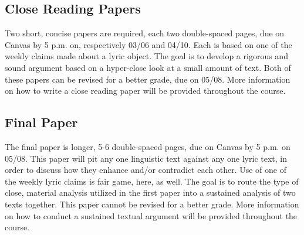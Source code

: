 \documentclass[12pt]{article}
\begin{document}
\subsection{Close Reading Papers}
Two short, concise papers are required, each two double-spaced pages, due on Canvas by 5 p.m. on, respectively 03/06 and 04/10. Each is based on one of the weekly claims made about a lyric object. The goal is to develop a rigorous and sound argument based on a hyper-close look at a small amount of text. Both of these papers can be revised for a better grade, due on 05/08. More information on how to write a close reading paper will be provided throughout the course.

\subsection{Final Paper} 
The final paper is longer, 5-6 double-spaced pages, due on Canvas by 5 p.m. on 05/08. This paper will pit any one linguistic text against any one lyric text, in order to discuss how they enhance and/or contradict each other. Use of one of the weekly lyric claims is fair game, here, as well. The goal is to route the type of close, material analysis utilized in the first paper into a sustained analysis of two texts together. This paper cannot be revised for a better grade. More information on how to conduct a sustained textual argument will be provided throughout the course.
\end{document}
